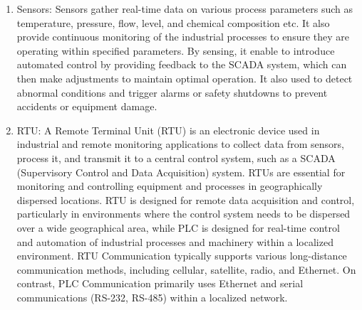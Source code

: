 \begin{enumerate}
   \item Sensors: Sensors gather real-time data on various process parameters such as temperature, pressure, flow, level, and chemical composition etc. It also provide continuous monitoring of the industrial processes to ensure they are operating within specified parameters. By sensing, it enable to introduce automated control by providing feedback to the SCADA system, which can then make adjustments to maintain optimal operation. It also used to detect abnormal conditions and trigger alarms or safety shutdowns to prevent accidents or equipment damage.

    \item RTU: A Remote Terminal Unit (RTU) is an electronic device used in industrial and remote monitoring applications to collect data from sensors, process it, and transmit it to a central control system, such as a SCADA (Supervisory Control and Data Acquisition) system. RTUs are essential for monitoring and controlling equipment and processes in geographically dispersed locations. RTU is designed for remote data acquisition and control, particularly in environments where the control system needs to be dispersed over a wide geographical area, while PLC is designed for real-time control and automation of industrial processes and machinery within a localized environment. RTU Communication typically supports various long-distance communication methods, including cellular, satellite, radio, and Ethernet. On contrast, PLC Communication primarily uses Ethernet and serial communications (RS-232, RS-485) within a localized network.
   

\end{enumerate}
